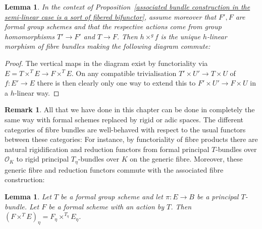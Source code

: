 \documentclass[10pt,oneside]{amsart}
\newtheorem{lemma}[theorem]{Lemma}
\theoremstyle{definition}
\newtheorem{remark}[theorem]{Remark}
\begin{document}
	\begin{lemma}\label{universal property of associated fibre construction in the semilinear case}
		In the context of Proposition~\ref{associated bundle construction in the semi-linear case is a sort of fibered bifunctor}, assume moreover that $F',F$ are formal group schemes and that the respective actions come from group homomorphisms $T'\to F'$ and $T\to F$.
		Then $h\times^g f$ is the unique $h$-linear morphism of fibre bundles making the following diagram commute:
		\begin{center}
		\end{center}
	\end{lemma}
	\begin{proof}
		 The vertical maps in the diagram exist by functoriality via $E=T\times^{T}E\rightarrow F\times^{T}E$. 
		On any compatible trivialisation $T'\times U'\rightarrow T\times U$ of $f:E'\rightarrow E$ there is then clearly only one way to extend this to $F'\times U'\rightarrow F\times U$ in a $h$-linear way.
	\end{proof}
	
	\begin{remark}\label{appendix in the case of rigid spaces and schemes}
	All that we have done in this chapter can be done in completely the same way with formal schemes replaced by rigid or adic spaces. The different categories of fibre bundles are well-behaved with respect to the usual functors between these categories: For instance, by functoriality of fibre products there are natural rigidification and reduction functors from formal principal $T$-bundles over $\mathcal O_K$ to rigid principal $T_\eta$-bundles over $K$ on the generic fibre. Moreover, these generic fibre and reduction functors commute with the associated fibre construction:
	\end{remark}
	\begin{lemma}\label{associated bundle commutes with generic fibre}
		Let $T$ be a formal group scheme and let $\pi:E\rightarrow B$ be a principal $T$-bundle. Let $F$ be a formal scheme with an action by $T$. Then $(F\times^T E)_\eta = F_\eta\times^{T_\eta} E_\eta$.
	\end{lemma}
  



 

	
	
	
\end{document}
